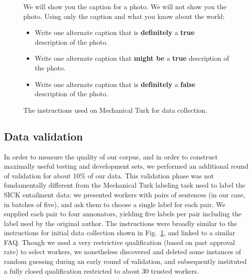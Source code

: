 \begin{figure}
\begin{framed}
\small
We will show you the caption for a photo. We will not show you the photo. Using only the caption and what you know about the world:
\begin{itemize}
\item Write one alternate caption that is \textbf{definitely} a \textbf{true} description of the photo. 
\item Write one alternate caption that \textbf{might be} a \textbf{true} description of the photo. 
\item Write one alternate caption that is \textbf{definitely} a \textbf{false} description of the photo. 
\end{itemize}
\end{framed}

\caption{\label{instructions-1}The instructions used on Mechanical Turk for data collection.}
\end{figure}

\subsection{Data validation}

In order to measure the quality of our corpus, and in order to construct maximally useful testing and development sets, we performed an additional round of validation for about 10\% of our data.
This validation phase was not fundamentally different from the Mechanical Turk labeling task used to label the SICK entailment data: we presented workers with pairs of sentences (in our case, in batches of five), and ask them to choose a single label for each pair. We supplied each pair to four annonators, yielding five labels per pair including the label used by the original author. The instructions were broadly similar to the instructions for initial data collection shown in Fig.~\ref{instructions-1}, and linked to a similar FAQ. Though we used a very restrictive qualification (based on past approval rate) to select workers, we nonetheless discovered and deleted some instances of random guessing during an early round of validation, and subsequently instituted a fully closed qualification restricted to about 30 trusted workers.

